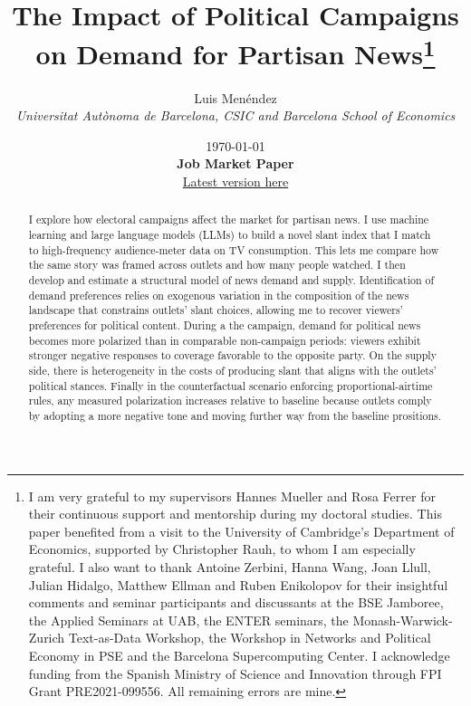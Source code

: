 \documentclass[12pt]{article}
\title{The Impact of Political Campaigns on Demand for Partisan News\thanks{I am very grateful to my supervisors Hannes Mueller and Rosa Ferrer for their continuous support and mentorship during my doctoral studies. This paper benefited from a visit to the University of Cambridge’s Department of Economics, supported by Christopher Rauh, to whom I am especially grateful. I also want to thank Antoine Zerbini,  Hanna Wang, Joan Llull, Julian Hidalgo, Matthew Ellman and Ruben Enikolopov for their insightful comments and seminar participants and discussants at the BSE Jamboree, the Applied Seminars at UAB, the ENTER seminars, the Monash-Warwick-Zurich Text-as-Data Workshop, the Workshop in Networks and Political Economy in PSE and the Barcelona Supercomputing Center. I acknowledge funding from the Spanish Ministry of Science and Innovation through FPI Grant PRE2021-099556. All remaining errors are mine.}}
\author{Luis  Menéndez \\
	\textit{\small Universitat Autònoma de Barcelona, CSIC and Barcelona School of Economics}
} %
\date{%
	\today\\[0.2ex]
	{\bfseries Job Market Paper}\\[0.2ex]
	{\normalsize\href{https://www.dropbox.com/scl/fi/f3546vufz11vj5r63xml4/elections_draft.pdf?rlkey=exjw9vm3sasahlb54ohjf2tyx\&e=1\&dl=0}{Latest version here}}
}
\renewcommand\thepart{}      %
\renewcommand\partname{}      %
\begin{document}
	
	\renewcommand\thepart{}      %
	\renewcommand\partname{}      %
	
	
	\maketitle
	\enlargethispage{2\baselineskip}
	
	
	\vspace{-1cm}
	
	
	\begin{abstract}
		
		
		
		
		I explore how electoral campaigns affect the market for partisan news. I use machine learning and large language models (LLMs) to build a novel slant index that I match to high-frequency audience-meter data on TV consumption. This lets me compare how the same story was framed across outlets and how many people watched. I then develop and estimate a structural model of news demand and supply. Identification of demand preferences relies on exogenous variation in the composition of the news landscape that constrains outlets’ slant choices, allowing me to recover viewers’ preferences for political content. During a the campaign, demand for political news becomes more polarized than in comparable non-campaign periods: viewers exhibit stronger negative responses to coverage favorable to the opposite party. On the supply side, there is heterogeneity in the costs of producing slant that aligns with the outlets’ political stances. Finally in the counterfactual scenario enforcing proportional-airtime rules, any measured polarization increases relative to baseline because outlets comply by adopting a more negative tone and moving further way from the baseline prositions. 
		
		
		
		

\end{abstract}
\end{document}

